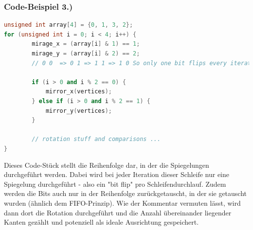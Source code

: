 \documentclass[12pt]{article}
\begin{document}
\newpage

\subsubsection*{Code-Beispiel 3.)}
\begin{lstlisting}[language=C++]
unsigned int array[4] = {0, 1, 3, 2};
for (unsigned int i = 0; i < 4; i++) {
        mirage_x = (array[i] & 1) == 1;
        mirage_y = (array[i] & 2) == 2;
        // 0 0  => 0 1 => 1 1 => 1 0 So only one bit flips every iteration

        if (i > 0 and i % 2 == 0) {
            mirror_x(vertices);
        } else if (i > 0 and i % 2 == 1) {
            mirror_y(vertices);
        }
        
        // rotation stuff and comparisons ...
}
\end{lstlisting}

Dieses Code-Stück stellt die Reihenfolge dar, in der die Spiegelungen durchgeführt werden. Dabei wird bei jeder Iteration dieser Schleife nur eine Spiegelung durchgeführt - also ein "bit flip" pro Schleifendurchlauf. Zudem werden die Bits auch nur in der Reihenfolge zurückgetauscht, in der sie getauscht wurden (ähnlich dem FIFO-Prinzip). Wie der Kommentar vermuten lässt, wird dann dort die Rotation durchgeführt und die Anzahl übereinander liegender Kanten gezählt und potenziell als ideale Ausrichtung gespeichert.
\end{document}
